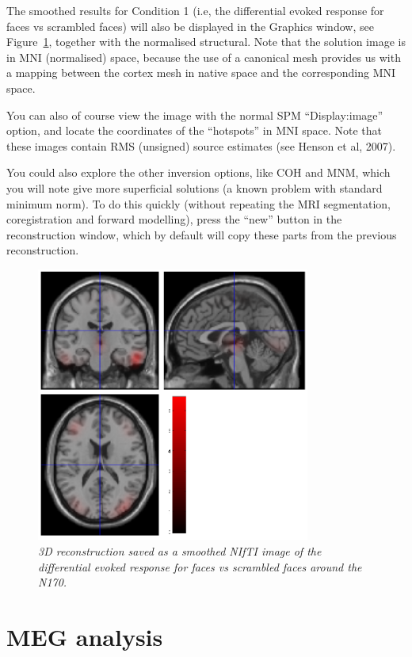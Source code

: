 The smoothed results for Condition 1 (i.e, the differential evoked response for faces vs scrambled faces) will also be displayed in the Graphics window, see Figure~\ref{multimodal:fig:eegrecon}, together with the normalised structural. Note that the solution image is in MNI (normalised) space, because the use of a canonical mesh provides us with a mapping between the cortex mesh in native space and the corresponding MNI space.

You can also of course view the image with the normal SPM ``Display:image'' option, and locate the coordinates of the ``hotspots'' in MNI space. Note that these images contain RMS (unsigned) source estimates (see Henson et al, 2007).

You could also explore the other inversion options, like COH and MNM, which you will note give more superficial solutions (a known problem with standard minimum norm). To do this quickly (without repeating the MRI segmentation, coregistration and forward modelling), press the ``new'' button in the reconstruction window, which by default will copy these parts from the previous reconstruction.

\begin{figure}[h!t]
\begin{center}
\includegraphics[width=90mm]{multimodal/figures/eeg_recon.png}
\caption{\em 3D reconstruction saved as a smoothed NIfTI image of the differential evoked response for faces vs scrambled faces around the N170. \label{multimodal:fig:eegrecon}}
\end{center}
\end{figure}

\section{MEG analysis}


